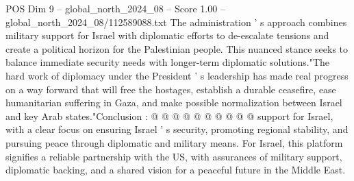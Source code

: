 \begin{textsample}{POS Dim 9 – global\_north\_2024\_08 – Score 1.00 – global\_north\_2024\_08/112589088.txt}
The administration ' s approach combines military support for Israel with diplomatic efforts to de-escalate tensions and create a political horizon for the Palestinian people.
This nuanced stance seeks to balance immediate security needs with longer-term diplomatic solutions."The hard work of diplomacy under the President ' s leadership has made real progress on a way forward that will free the hostages, establish a durable ceasefire, ease humanitarian suffering in Gaza, and make possible normalization between Israel and key Arab states."Conclusion : @ @ @ @ @ @ @ @ @ @ support for Israel, with a clear focus on ensuring Israel ' s security, promoting regional stability, and pursuing peace through diplomatic and military means.
For Israel, this platform signifies a reliable partnership with the US, with assurances of military support, diplomatic backing, and a shared vision for a peaceful future in the Middle East.

\end{textsample}
